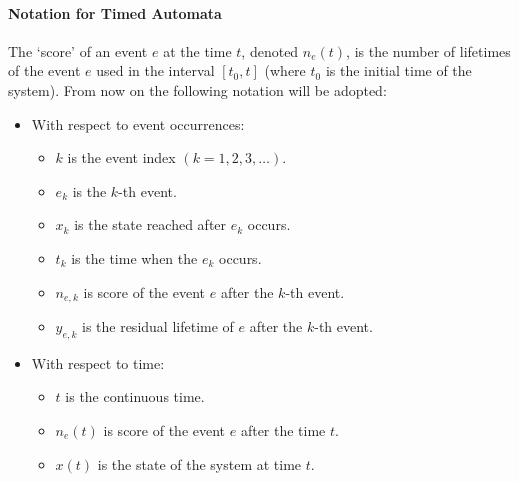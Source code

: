 \documentclass[12pt,a4paper]{article}
\begin{document}
\paragraph{Notation for Timed Automata}
The `score’ of an event $e$ at the time $t$, denoted $n_e (t)$, is the number of lifetimes of the event $e$ used in the interval $[t_0,t]$ (where $t_0$ is the initial time of the system). From now on the following notation will be adopted:
\begin{itemize}
\item With respect to event occurrences:
	\begin{itemize}
	\item $k$ is the event index $(k=1,2,3,\dots)$.
	\item $e_k$ is the $k$-th event.
	\item $x_k$ is the state reached after $e_k$ occurs.
	\item $t_k$ is the time when the $e_k$ occurs.
	\item $n_{e,k}$ is score of the event $e$ after the $k$-th event.
	\item $y_{e,k}$ is the residual lifetime of $e$ after the $k$-th event.
	\end{itemize} 
\item With respect to time:
	\begin{itemize}
	\item $t$ is the continuous time.
	\item $n_{e}(t)$ is score of the event $e$ after the time $t$.
	\item $x(t)$ is the state of the system at time $t$.
	\end{itemize} 
\end{itemize}
\end{document}
